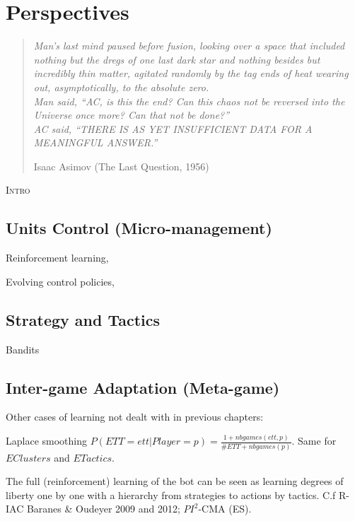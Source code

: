 \chapter{Perspectives}

\begin{quotation}\textit{
Man's last mind paused before fusion, looking over a space that included nothing but the dregs of one last dark star and nothing besides but incredibly thin matter, agitated randomly by the tag ends of heat wearing out, asymptotically, to the absolute zero.\\
Man said, ``AC, is this the end? Can this chaos not be reversed into the Universe once more? Can that not be done?''\\
AC said, ``THERE IS AS YET INSUFFICIENT DATA FOR A MEANINGFUL ANSWER.''
}
\begin{flushright}Isaac Asimov (The Last Question, 1956)\end{flushright}\end{quotation}

\lettrine{I}{ntro}

\chaptertoc

\section{Units Control (Micro-management)}
Reinforcement learning, \citep{Marthi05concurrenthierarchical}


Evolving control policies, \citep{Miles2007}

\section{Strategy and Tactics}

Bandits

\section{Inter-game Adaptation (Meta-game)}
Other cases of learning not dealt with in previous chapters:
\citep{metalevelbehavioradaptrts}


Laplace smoothing $P(ETT=ett|Player=p)= \frac{1 + nbgames(ett,p)}{\#ETT + nbgames(p)}$. Same for $EClusters$ and $ETactics$.


The full (reinforcement) learning of the bot can be seen as learning degrees of liberty one by one with a hierarchy from strategies to actions by tactics. C.f R-IAC Baranes \& Oudeyer 2009 and 2012; $PI^2$-CMA (ES).


